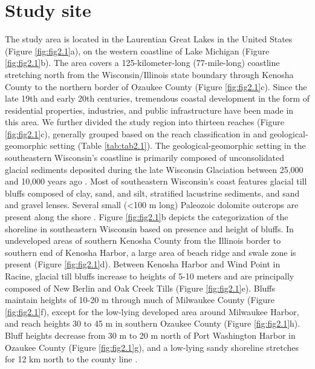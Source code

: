 \section{Study site} 
\label{Study site} 

The study area is located in the Laurentian Great Lakes in the United States
(Figure \ref{fig:fig2.1}a), on the western coastline of Lake Michigan (Figure
\ref{fig:fig2.1}b). The area covers a 125-kilometer-long (77-mile-long)
coastline stretching north from the Wisconsin/Illinois state boundary through
Kenosha County to the northern border of Ozaukee County (Figure
\ref{fig:fig2.1}c). Since the late 19th and early 20th centuries, tremendous
coastal development in the form of residential properties, industries, and
public infrastructure have been made in this area. We further divided the study
region into thirteen reaches (Figure \ref{fig:fig2.1}c), generally grouped based
on the reach classification in \citet{mickelson1977shoreline} and
geological-geomorphic setting (Table \ref{tab:tab2.1}). The
geological-geomorphic setting in the southeastern Wisconsin’s coastline is
primarily composed of unconsolidated glacial sediments deposited during the late
Wisconsin Glaciation between 25,000 and 10,000 years ago
\citep{syverson2011quaternary,mickelson2004erosion}. Most of southeastern
Wisconsin’s coast features glacial till bluffs composed of clay, sand, and silt,
stratified lacustrine sediments, and sand and gravel lenses. Several small (<100
m long) Paleozoic dolomite outcrops are present along the shore
\citep{mickelson1977shoreline,mickelson2004erosion}.  Figure \ref{fig:fig2.1}b
depicts the categorization of the shoreline in southeastern Wisconsin based on
presence and height of bluffs. In undeveloped areas of southern Kenosha County
from the Illinois border to southern end of Kenosha Harbor, a large area of
beach ridge and swale zone is present (Figure \ref{fig:fig2.1}d). Between
Kenosha Harbor and Wind Point in Racine, glacial till bluffs increase to heights
of 5-10 meters and are principally composed of New Berlin and Oak Creek Tills
(Figure \ref{fig:fig2.1}e). Bluffs maintain heights of 10-20 m through much of
Milwaukee County (Figure \ref{fig:fig2.1}f), except for the low-lying developed
area around Milwaukee Harbor, and reach heights 30 to 45 m in southern Ozaukee
County (Figure \ref{fig:fig2.1}h). Bluff heights decrease from 30 m to 20 m
north of Port Washington Harbor in Ozaukee County (Figure \ref{fig:fig2.1}g),
and a low-lying sandy shoreline stretches for 12 km north to the county line
\citep{mickelson1977shoreline}.

